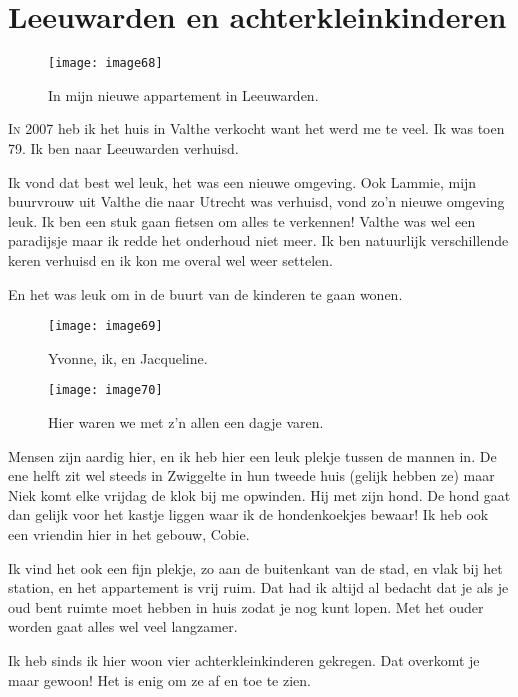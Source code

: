 
\chapter*{\label{ref-014}Leeuwarden en achterkleinkinderen}

\begin{figure}[h]
    \texttt{[image: image68]}
    \caption{In mijn nieuwe appartement in Leeuwarden.}
\end{figure}

\lettrine[lines=2, loversize=0.3, lraise=0]{\initfamily I}{n} 2007 heb ik het huis in Valthe verkocht want het werd me te veel. Ik was toen 79. Ik ben naar Leeuwarden verhuisd.

Ik vond dat best wel leuk, het was een nieuwe omgeving. Ook Lammie, mijn buurvrouw uit Valthe die naar Utrecht was verhuisd, vond zo’n nieuwe omgeving leuk. Ik ben een stuk gaan fietsen om alles te verkennen! Valthe was wel een paradijsje maar ik redde het onderhoud niet meer. Ik ben natuurlijk verschillende keren verhuisd en ik kon me overal wel weer settelen. 

En het was leuk om in de buurt van de kinderen te gaan wonen. 

\begin{figure}[h]
    \texttt{[image: image69]}
    \caption{Yvonne, ik, en Jacqueline.}
\end{figure}
\begin{figure}[h]
    \texttt{[image: image70]}
    \caption{Hier waren we met z'n allen een dagje varen.}
\end{figure}

Mensen zijn aardig hier, en ik heb hier een leuk plekje tussen de mannen in. De ene helft zit wel steeds in Zwiggelte in hun tweede huis (gelijk hebben ze) maar Niek komt elke vrijdag de klok bij me opwinden. Hij met zijn hond. De hond gaat dan gelijk voor het kastje liggen waar ik de hondenkoekjes bewaar! Ik heb ook een vriendin hier in het gebouw, Cobie. 

Ik vind het ook een fijn plekje, zo aan de buitenkant van de stad, en vlak bij het station, en het appartement is vrij ruim. Dat had ik altijd al bedacht dat je als je oud bent ruimte moet hebben in huis zodat je nog kunt lopen. Met het ouder worden gaat alles wel veel langzamer. 



Ik heb sinds ik hier woon vier achterkleinkinderen gekregen. Dat overkomt je maar gewoon! Het is enig om ze af en toe te zien.

